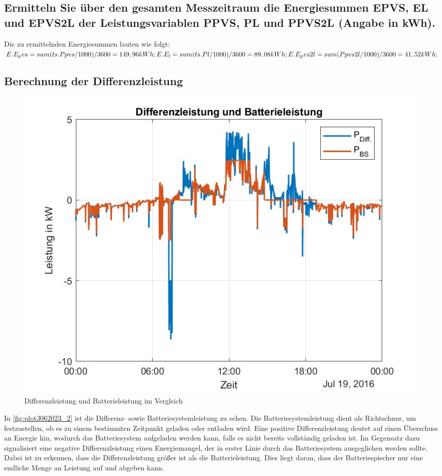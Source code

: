 \subsection{Ermitteln Sie über den gesamten Messzeitraum die Energiesummen EPVS, EL und EPVS2L der
Leistungsvariablen PPVS, PL und PPVS2L (Angabe in kWh).}
Die zu ermittelnden Energiesummen lauten wie folgt:
$E.E_pvs = sum(ts.Ppvs/1000)/3600=149,96kWh;\\
E.E_l = sum(ts.Pl/1000)/3600=89,08kWh;\\
E.E_pvs2l = sum(Ppvs2l/1000)/3600=41,52kWh;$\\

\subsection{Berechnung der Differenzleistung}
\begin{figure}[H]
    \centering
    \includegraphics[width=\textwidth]{Abbildungen/plot_vorbereitungsfrage3.jpg}
    \caption{Differenzleistung und Batterieleistung im Vergleich}
    \label{fig:plot3062023_2}
\end{figure}
In \autoref{fig:plot3062023_2} ist die Differenz- sowie Batteriesystemleistung zu sehen. 
Die Batteriesystemleistung dient als Richtschnur, um festzustellen, ob es zu einem bestimmten Zeitpunkt geladen oder entladen wird. 
Eine positive Differenzleistung deutet auf einen Überschuss an Energie hin, wodurch das Batteriesystem aufgeladen werden kann, falls es nicht bereits vollständig geladen ist. Im Gegensatz dazu signalisiert eine negative Differenzleistung einen Energiemangel, der in erster Linie durch das Batteriesystem ausgeglichen werden sollte.
Dabei ist zu erkennen, dass die Differenzleistung größer ist als die Batterieleistung. 
Dies liegt daran, dass der Batteriespiecher nur eine endliche Menge an Leistung auf und abgeben kann.

